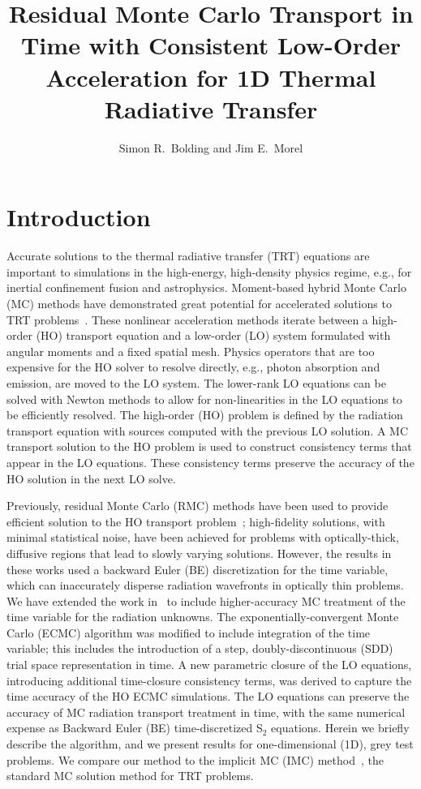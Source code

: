 \documentclass{anstrans}
\title{Residual Monte Carlo Transport in Time with Consistent Low-Order Acceleration for
    1D Thermal Radiative Transfer}
\author{Simon R.~Bolding and Jim E.~Morel}
\institute{Texas A\&M University Nuclear Engineering Department, 
}
\begin{document}
\section{Introduction}

Accurate solutions to the thermal radiative transfer (TRT) equations are important to
simulations in the
high-energy, high-density physics regime, e.g., for inertial
confinement fusion and astrophysics.  Moment-based hybrid Monte Carlo (MC)
methods have demonstrated great potential for accelerated
solutions to TRT problems~\cite{rmc,bolding_nse,holo_rh}.   These nonlinear acceleration methods iterate between a
high-order (HO) transport equation and a low-order (LO) system formulated with angular moments
and a fixed spatial mesh.  Physics operators that
are too expensive for the HO solver to resolve directly, e.g., photon absorption and emission,
are moved to the LO system. The lower-rank LO equations can be solved with Newton
methods to allow for non-linearities in the LO equations to be efficiently
resolved.  The high-order (HO) problem is defined by the radiation transport equation with
sources computed with the previous LO solution. A MC transport solution to the HO
problem is used to construct consistency terms that appear in the LO equations. These consistency terms preserve the accuracy of the HO
solution in the next LO solve.

Previously, residual Monte Carlo (RMC) methods have been used to provide efficient
solution to the HO transport problem~\cite{rmc,bolding_nse}; high-fidelity solutions,
with minimal statistical noise, have been achieved for problems with optically-thick, diffusive
regions that lead to slowly varying
solutions.  However, the results in these works used a backward
Euler (BE) discretization for the time variable, which can inaccurately disperse radiation
wavefronts in optically thin problems. We have extended the work
in~\cite{bolding_nse} to include higher-accuracy MC treatment of the time variable for the
radiation unknowns. The exponentially-convergent Monte Carlo (ECMC)
algorithm was modified to include integration of the time variable;
this includes the introduction of a step, doubly-discontinuous (SDD) trial space representation
in time.  A new
parametric closure of the LO equations, introducing additional time-closure consistency
terms, was derived to capture the time accuracy of the HO
ECMC simulations.  The LO equations can preserve the accuracy of MC radiation transport treatment in
time, with the same numerical expense as Backward Euler (BE) time-discretized S$_2$
equations. 
Herein we briefly describe the algorithm, and we present results for
one-dimensional (1D), grey test problems.  We compare our method to the implicit MC
(IMC) method~\cite{fnc}, the standard MC solution
method for TRT problems.
\end{document}
